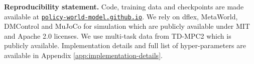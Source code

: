 \documentclass{article} %
\begin{document}
\newpage
\textbf{Reproducibility statement.} Code, training data and checkpoints are made available at \href{https://policy-world-model.github.io}{\texttt{policy-world-model.github.io}}. We rely on dflex, MetaWorld, DMControl and MuJoCo for simulation which are publicly available under MIT and Apache 2.0 licenses. We use multi-task data from TD-MPC2 which is publicly available. Implementation details and full list of hyper-parameters are available in Appendix \ref{app:implementation-details}.



\newpage

\end{document}
